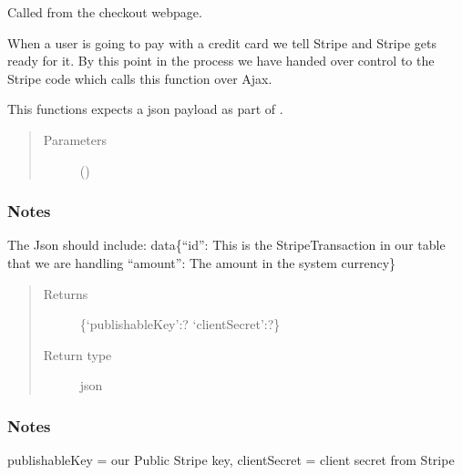 \documentclass[letterpaper,10pt,english]{sphinxmanual}
\begin{document}

\begin{fulllineitems}
\label{\detokenize{payments:payments.core.stripe_manual_payment_intent}}
Called from the checkout webpage.

When a user is going to pay with a credit card we
tell Stripe and Stripe gets ready for it. By this point in the process
we have handed over control to the Stripe code which calls this function
over Ajax.

This functions expects a json payload as part of .
\begin{quote}\begin{description}
\item[{Parameters}] \leavevmode
{} () \textendash{} 

\end{description}\end{quote}
\subsubsection*{Notes}

The Json should include:
data\{“id”: This is the StripeTransaction in our table that we are handling
“amount”: The amount in the system currency\}
\begin{quote}\begin{description}
\item[{Returns}] \leavevmode
\{‘publishableKey’:? ‘clientSecret’:?\}

\item[{Return type}] \leavevmode
json

\end{description}\end{quote}
\subsubsection*{Notes}

publishableKey = our Public Stripe key,
clientSecret = client secret from Stripe

\end{fulllineitems}
\end{document}
